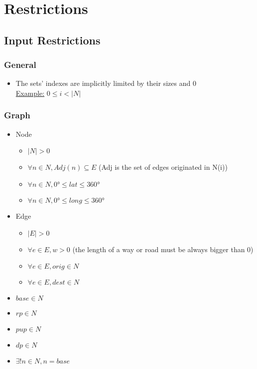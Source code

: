 \section{Restrictions}


\subsection{Input Restrictions}

\subsubsection{General}
\begin{itemize}
    \item The sets' indexes are implicitly limited by their sizes and 0\\ \uline{Example:}
    $ 0 \leq i < |N| $
\end{itemize}

\subsubsection{Graph}
\begin{itemize}
    \item Node
    \begin{itemize}
        \item $ |N| > 0 $ 
        \item $ \forall n \in N, Adj(n) \subseteq E $ (Adj is the set of edges originated in N(i))
        \item $ \forall n \in N, \ang{0} \leq lat \leq \ang{360} $
        \item $ \forall n \in N, \ang{0} \leq long \leq \ang{360} $
    \end{itemize}   
    
    \item{Edge}
    \begin{itemize}
        \item $ |E| > 0 $
        \item $ \forall e \in E, w > 0 $ (the length of a way or road must be always bigger than 0)
        \item $ \forall e \in E, orig \in N $ 
        \item $ \forall e \in E, dest \in N $
    \end{itemize}
    
    \item $ base \in N $
    \item $ rp \in N $
    \item $ pup \in N $
    \item $ dp \in N $
    \item $ \exists! n \in N, n = base $
    
\end{itemize}

